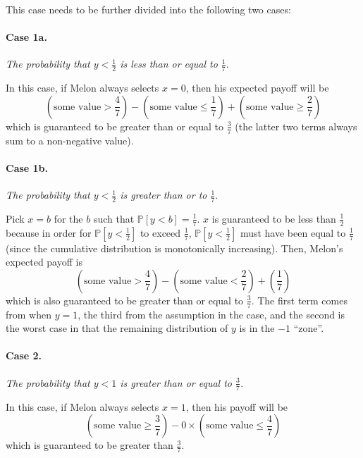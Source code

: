 \documentclass{6046}
\begin{document}
This case needs to be further divided into the following two cases:
\vspace{-1em}

\paragraph{Case 1a.} {\it
The probability that $y < \frac{1}{2}$ is
less than or equal to $\frac{1}{7}$}.\\
\vspace{-1em}

In this case, if Melon always selects $x = 0$, then his expected
payoff will be 
\[
    (\text{some value} >\frac{4}{7})
  - (\text{some value} \le \frac{1}{7})
  + (\text{some value} \ge \frac{2}{7})
\]
which is guaranteed to be greater than or equal to $\frac{3}{7}$
(the latter two terms always sum to a non-negative value).

\paragraph{Case 1b.} {\it
The probability that $y < \frac{1}{2}$ is
greater than or to $\frac{1}{7}$}.\\
\vspace{-1em}

Pick $x = b$ for the $b$ such that
$\mathbb{P}[y < b] = \frac{1}{7}$. $x$ is guaranteed
to be less than $\frac{1}{2}$ because in order for
$\mathbb{P}[y < \frac{1}{2}]$ to exceed $\frac{1}{7}$,
$\mathbb{P}[y < \frac{1}{2}]$ must have been equal to $\frac{1}{7}$
(since the cumulative distribution is monotonically increasing).
Then, Melon's expected payoff is 
\[
    (\text{some value} >\frac{4}{7})
  - (\text{some value} < \frac{2}{7})
  + (\frac{1}{7})
\]
which is also guaranteed to be greater than or equal to $\frac{3}{7}$.
The first term comes from when $y = 1$, the third from the assumption
in the case, and the second is the worst case in that the remaining
distribution of $y$ is in the $-1$ ``zone''.

\paragraph{Case 2.} {\it
The probability that $y < 1$ is greater than or equal to $\frac{3}{7}$.
}
\vspace{-1em}

In this case, if Melon always selects $x = 1$, then his payoff will be
\[
    (\text{some value} \ge \frac{3}{7})
  - 0 \times (\text{some value} \le \frac{4}{7})
\]
which is guaranteed to be greater than $\frac{3}{7}$.
\end{document}
